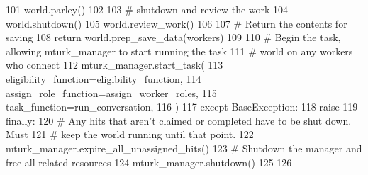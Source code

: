 \begin{DoxyCode}
101                 world.parley()
102 
103             \textcolor{comment}{# shutdown and review the work}
104             world.shutdown()
105             world.review\_work()
106 
107             \textcolor{comment}{# Return the contents for saving}
108             \textcolor{keywordflow}{return} world.prep\_save\_data(workers)
109 
110         \textcolor{comment}{# Begin the task, allowing mturk\_manager to start running the task}
111         \textcolor{comment}{# world on any workers who connect}
112         mturk\_manager.start\_task(
113             eligibility\_function=eligibility\_function,
114             assign\_role\_function=assign\_worker\_roles,
115             task\_function=run\_conversation,
116         )
117     \textcolor{keywordflow}{except} BaseException:
118         \textcolor{keywordflow}{raise}
119     \textcolor{keywordflow}{finally}:
120         \textcolor{comment}{# Any hits that aren't claimed or completed have to be shut down. Must}
121         \textcolor{comment}{# keep the world running until that point.}
122         mturk\_manager.expire\_all\_unassigned\_hits()
123         \textcolor{comment}{# Shutdown the manager and free all related resources}
124         mturk\_manager.shutdown()
125 
126 
\end{DoxyCode}
